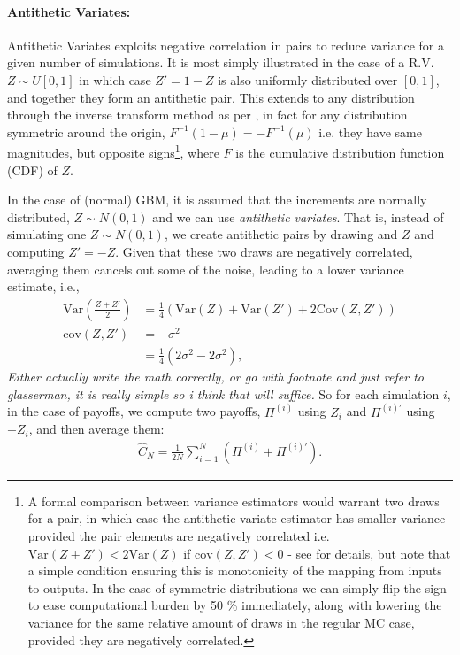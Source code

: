 \paragraph{Antithetic Variates:} Antithetic Variates exploits negative correlation in pairs to reduce variance for a given number of simulations. It is most simply illustrated in the case of a R.V. $Z \sim U[0,1]$ in which case $Z' = 1 - Z$ is also uniformly distributed over $[0,1]$, and together they form an antithetic pair. This extends to any distribution through the inverse transform method as per \textcite{glassermanMonteCarloMethods2003}, in fact for any distribution symmetric around the origin, $F^{-1}(1-\mu) = - F^{-1}(\mu)$ i.e. they have same magnitudes, but opposite signs\footnote{A formal comparison between variance estimators would warrant two draws for a pair, in which case the antithetic variate estimator has smaller variance provided the pair elements are negatively correlated i.e. $\text{Var}(Z+Z') < 2\text{Var}(Z)$ if $\text{cov}(Z, Z') < 0$ - see \textcite{glassermanMonteCarloMethods2003} for details, but note that a simple condition ensuring this is monotonicity of the mapping from inputs to outputs. In the case of symmetric distributions we can simply flip the sign to ease computational burden by 50 \% immediately, along with lowering the variance for the same relative amount of draws in the regular MC case, provided they are negatively correlated.}, where $F$ is the cumulative distribution function (CDF) of $Z$.

In the case of (normal) GBM, it is assumed that the increments are normally distributed, $Z \sim N(0,1)$ and we can use \emph{antithetic variates}. That is, instead of simulating one $Z \sim N(0,1)$, we create antithetic pairs by drawing and $Z$ and computing $Z' = -Z$. Given that these two draws are negatively correlated, averaging them cancels out some of the noise, leading to a lower variance estimate, i.e., 
\begin{align*}
    \text{Var}\left(\frac{Z + Z'}{2}\right) &= \frac{1}{4} \left( \text{Var}(Z) + \text{Var}(Z') + 2\text{Cov}(Z, Z') \right) \\
    \text{cov}(Z, Z') &= -\sigma^2 \\
    &= \frac{1}{4} \left( 2\sigma^2 - 2\sigma^2 \right),
\end{align*}
\textit{Either actually write the math correctly, or go with footnote and just refer to glasserman, it is really simple so i think that will suffice.}
So for each simulation $i$, in the case of payoffs, we compute two payoffs, $\Pi^{(i)}$ using $Z_i$ and $\Pi^{(i)'}$ using $-Z_i$, and then average them:
\begin{align*}
    \hat{C}_N = \frac{1}{2N} \sum_{i=1}^{N} \left( \Pi^{(i)} + \Pi^{(i)'} \right).
\end{align*}

